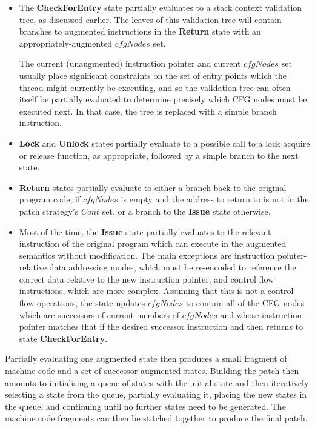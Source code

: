 \begin{itemize}
\item The \textbf{CheckForEntry} state partially evaluates to a stack
  context validation tree, as discussed earlier.  The leaves of this
  validation tree will contain branches to augmented instructions in
  the \textbf{Return} state with an appropriately-augmented $cfgNodes$
  set.

  The current (unaugmented) instruction pointer and current $cfgNodes$
  set usually place significant constraints on the set of entry points
  which the thread might currently be executing, and so the validation
  tree can often itself be partially evaluated to determine precisely
  which CFG nodes must be executed next.  In that case, the tree is
  replaced with a simple branch instruction.
\item \textbf{Lock} and \textbf{Unlock} states partially evaluate to a
  possible call to a lock acquire or release function, as appropriate,
  followed by a simple branch to the next state.
\item \textbf{Return} states partially evaluate to either a branch
  back to the original program code, if $cfgNodes$ is empty and the
  address to return to is not in the patch strategy's $Cont$ set, or a
  branch to the \textbf{Issue} state otherwise.
\item Most of the time, the \textbf{Issue} state partially evaluates
  to the relevant instruction of the original program which can
  execute in the augmented semantics without modification.  The main
  exceptions are instruction pointer-relative data addressing modes,
  which must be re-encoded to reference the correct data relative to
  the new instruction pointer, and control flow instructions, which
  are more complex.  Assuming that this is not a control flow
  operations, the state updates $cfgNodes$ to contain all of the CFG
  nodes which are successors of current members of $cfgNodes$ and
  whose instruction pointer matches that if the desired successor
  instruction and then returns to state \textbf{CheckForEntry}.
\end{itemize}

Partially evaluating one augmented state then produces a small
fragment of machine code and a set of successor augmented states.
Building the patch then amounts to initialising a queue of states with
the initial state and then iteratively selecting a state from the
queue, partially evaluating it, placing the new states in the queue,
and continuing until no further states need to be generated.  The
machine code fragments can then be stitched together to produce the
final patch.

